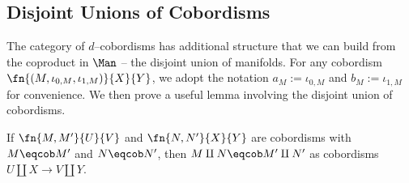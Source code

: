 
\subsection{Disjoint Unions of Cobordisms}

The category of $d$--cobordisms has additional structure that we can build from
the coproduct in $\Man$ -- the disjoint union of manifolds. For any cobordism
$\fn{(M, \iota_{0, M}, \iota_{1, M})}{X}{Y}$, we adopt the notation
$a_M := \iota_{0, M}$ and $b_M := \iota_{1, M}$ for convenience. We then prove
a useful lemma involving the disjoint union of cobordisms.

\begin{thm}\label{disjunion:welldef}
If $\fn{M, M'}{U}{V}$ and $\fn{N, N'}{X}{Y}$ are cobordisms with $M \eqcob M'$
and $N \eqcob N'$, then $M \amalg N \eqcob M' \amalg N'$ as cobordisms
$U \amalg X \to V \amalg Y$.
\end{thm}
